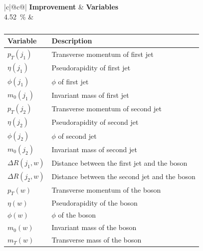 \begin{table}[h]
    \centering
    \label{tab:app_vars_1}
    \caption{}
    \begin{tabular}{ |c|@{}c@{}| }
        \hline
        \textbf{Improvement} & \textbf{Variables}\\
        \hline
        \SI{4.52}{\%} & 
        \begin{tabular}{ll}
            \hline
            Variable & Description\\
            \hline
            $p_T(j_1)$ & Transverse momentum of first jet\\
            $\eta(j_1)$ & Pseudorapidity of first jet\\
            $\phi(j_1)$ & $\phi$ of first jet\\
            $m_0(j_1)$ & Invariant mass of first jet\\

            $p_T(j_2)$ & Transverse momentum of second jet\\
            $\eta(j_2)$ & Pseudorapidity of second jet\\
            $\phi(j_2)$ & $\phi$ of second jet\\
            $m_0(j_2)$ & Invariant mass of second jet\\

            $\Delta R(j_1, w)$ & Distance between the first jet and the \PWplus boson\\
            $\Delta R(j_2, w)$ & Distance between the second jet and the \PWplus boson\\

            $p_T(w)$ & Transverse momentum of the \PWplus boson\\
            $\eta(w)$ & Pseudorapidity of the \PWplus boson\\
            $\phi(w)$ & $\phi$ of the \PWplus boson\\
            $m_0(w)$ & Invariant mass of the \PWplus boson\\
            $m_T(w)$ & Transverse mass of the \PWplus boson\\
            \hline
        \end{tabular}\\
        \hline
    \end{tabular}
\end{table}

